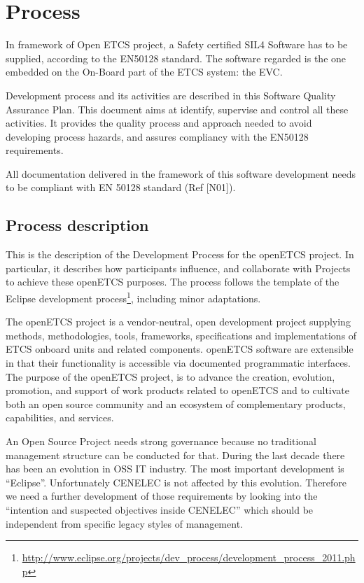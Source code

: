 \documentclass{template/openetcs_article}
\begin{document}
\section{Process}
In framework of Open ETCS project, a Safety certified SIL4 Software has to be supplied, according to the EN50128 standard. The software regarded is the one embedded on the On-Board part of the ETCS system: the EVC.

Development process and its activities are described in this Software Quality Assurance Plan. This document aims at identify, supervise and control all these activities. It provides the quality process and approach needed to avoid developing process hazards, and assures compliancy with the EN50128 requirements.

All documentation delivered in the framework of this software development needs to be compliant with EN 50128 standard (Ref [N01]).



\subsection{Process description}
This is the description of the Development Process for the openETCS project. In particular, it describes how participants influence, and collaborate with Projects to achieve these openETCS purposes. The process follows the template of the Eclipse development process\footnote{\url{http://www.eclipse.org/projects/dev\_process/development\_process\_2011.php}}, including minor adaptations.

The openETCS project is a vendor-neutral, open development project supplying methods, methodologies, tools, frameworks, specifications and implementations of ETCS onboard units and related components. openETCS software are extensible in that their functionality is accessible via documented programmatic interfaces. The purpose of the openETCS project, is to advance the creation, evolution, promotion, and support of work products related to openETCS and to cultivate both an open source community and an ecosystem of complementary products, capabilities, and services. 

An Open Source Project needs strong governance because no traditional management structure can be conducted for that. During the last decade there has been an evolution in OSS IT industry. The most important development is ``Eclipse''. Unfortunately CENELEC is not affected by this evolution. Therefore we need a further development of those requirements by looking into the ``intention and suspected objectives inside CENELEC'' which should be independent from specific legacy styles of management.
\end{document}
